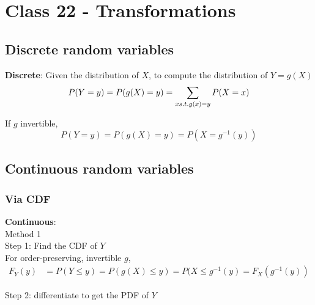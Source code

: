 \chapter{Class 22 - Transformations}


\section{Discrete random variables}

\begin{framed}
   \textbf{Discrete}: Given the distribution of $X$, to compute the distribution of $Y = g(X)$
    \[
       P(Y = y) = P(g(X) = y) = \sum_{x \\ s.t. g(x) = y} P(X = x)
   \] 

   If $g$ invertible,
   \[
      P(Y = y) = P(g(X) = y) = P( X = g^{-1}(y))
   \] 

   
  
\end{framed}
\section{Continuous random variables}

\subsection{Via CDF}
\begin{framed}

   \textbf{Continuous}: \\
   
   Method 1 \\

   Step 1: Find the CDF of $Y$ \\

   For order-preserving, invertible $g$, 
   \begin{align*}
      F_Y(y) &= P(Y \leq y) = P(g(X) \leq y) = P(X \leq g^{-1}(y) = F_X(g^{-1}(y))
   \end{align*}

   Step 2: differentiate to get the PDF of $Y$ \\
\end{framed}

